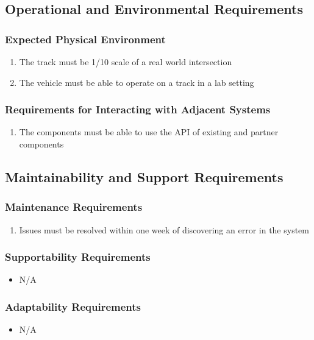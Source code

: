 \documentclass [11pt]{article}
\begin{document}
\subsection{Operational and Environmental Requirements}
\subsubsection{Expected Physical Environment }
	\begin{enumerate}[label=\textbf{\Alph*}:]
		\item The track must be 1/10 scale of a real world intersection
		\item The vehicle must be able to operate on a track in a lab setting
	\end{enumerate}
		
\subsubsection{Requirements for Interacting with Adjacent Systems}
	\begin{enumerate}[label=\textbf{\Alph*}:]
		\item The components must be able to use the API of existing and partner components
	\end{enumerate}

\subsection{Maintainability and Support Requirements }
\subsubsection{Maintenance Requirements }
	\begin{enumerate}[label=\textbf{\Alph*}:]
		\item  Issues must be resolved within one week of discovering an error in the system
	\end{enumerate}

\subsubsection{Supportability Requirements }
	\begin{itemize}
		\item N/A
	\end{itemize}

\subsubsection{Adaptability Requirements}
	\begin{itemize}
		\item N/A
	\end{itemize}
\end{document}
